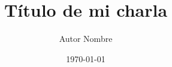 \documentclass[aspectratio=169,12pt]{MyTheme}
\title{Título de mi charla}
\author{Autor Nombre}
\institute{Instituto XYZ}
\date{\today}
\begin{document}
	
	\begin{frame}[plain]
		\titlepage
	\end{frame}
	
\end{document}

